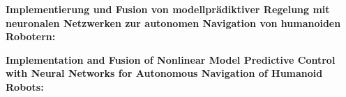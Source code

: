 \thispagestyle{empty}
\begin{center}
  \begin{minipage}[c][0.48\textheight][b]{0.9\textwidth}
    \small
    \textbf{
      Implementierung und Fusion von modellprädiktiver Regelung mit neuronalen Netzwerken zur autonomen Navigation von humanoiden Robotern:
    }\par
    \vspace{\baselineskip}
    
  \end{minipage}\par
  \vfill
  \begin{minipage}[c][0.48\textheight][b]{0.9\textwidth}
    \small
    \textbf{
      Implementation and Fusion of Nonlinear Model Predictive Control with Neural Networks for Autonomous Navigation of Humanoid Robots:
    }\par
    \vspace{\baselineskip}
    
  \end{minipage}
\end{center}
